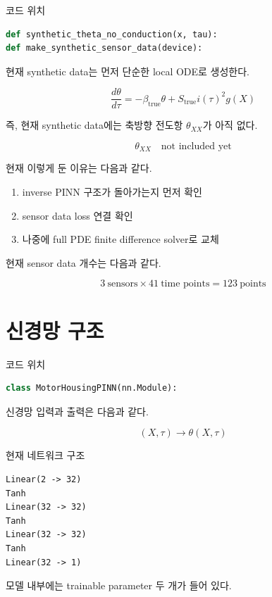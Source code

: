 \documentclass[11pt]{article}
\begin{document}
코드 위치

\begin{lstlisting}[language=Python]
def synthetic_theta_no_conduction(x, tau):
def make_synthetic_sensor_data(device):
\end{lstlisting}

현재 synthetic data는 먼저 단순한 local ODE로 생성한다.

\begin{equation}
\frac{d\theta}{d\tau}
=
-\beta_{\mathrm{true}}\theta
+
S_{\mathrm{true}}i(\tau)^2g(X)
\end{equation}

즉, 현재 synthetic data에는 축방향 전도항 \(\theta_{XX}\)가 아직 없다.

\begin{equation}
\theta_{XX} \quad \text{not included yet}
\end{equation}

현재 이렇게 둔 이유는 다음과 같다.

\begin{enumerate}[leftmargin=2em]
\item inverse PINN 구조가 돌아가는지 먼저 확인
\item sensor data loss 연결 확인
\item 나중에 full PDE finite difference solver로 교체
\end{enumerate}

현재 sensor data 개수는 다음과 같다.

\[
3~\text{sensors} \times 41~\text{time points}
=
123~\text{points}
\]

\section{신경망 구조}

코드 위치

\begin{lstlisting}[language=Python]
class MotorHousingPINN(nn.Module):
\end{lstlisting}

신경망 입력과 출력은 다음과 같다.

\[
(X,\tau) \longrightarrow \theta(X,\tau)
\]

현재 네트워크 구조

\begin{lstlisting}
Linear(2 -> 32)
Tanh
Linear(32 -> 32)
Tanh
Linear(32 -> 32)
Tanh
Linear(32 -> 1)
\end{lstlisting}

모델 내부에는 trainable parameter 두 개가 들어 있다.
\end{document}
